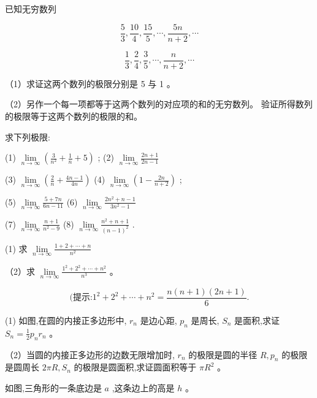 \documentclass[lang=cn,newtx,12pt,scheme=chinese]{elegantbook}
\begin{document}
\begin{problemset}[习题一]
	\item 已知无穷数列
	
	\[
	\frac{5}{3},\frac{10}{4},\frac{15}{5},\cdots ,\frac{5n}{n + 2},\cdots
	\]
	
	\[
	\frac{1}{3},\frac{2}{4},\frac{3}{5},\cdots ,\frac{n}{n + 2},\cdots
	\]
	
	（1）求证这两个数列的极限分别是 5 与 1 。
	
	（2）另作一个每一项都等于这两个数列的对应项的和的无穷数列。 验证所得数列的极限等于这两个数列的极限的和。
	
	\item 求下列极限:
	
	(1) \(\mathop{\lim }\limits_{{n \rightarrow \infty }}\left( {\frac{3}{{n}^{2}} + \frac{1}{n} + 5}\right)\) ; (2) \(\mathop{\lim }\limits_{{n \rightarrow \infty }}\frac{{2n} + 1}{{2n} - 1}\)
	
	(3) \(\mathop{\lim }\limits_{{n \rightarrow \infty }}\left( {\frac{2}{n} + \frac{{4n} - 1}{4n}}\right)\) (4) \(\mathop{\lim }\limits_{{n \rightarrow \infty }}\left( {1 - \frac{2n}{n + 2}}\right)\) ;
	
	(5) \(\mathop{\lim }\limits_{{n \rightarrow \infty }}\frac{5 + {7n}}{{6n} - {11}}\) (6) \(\mathop{\lim }\limits_{{n \rightarrow \infty }}\frac{2{n}^{2} + n - 1}{3{n}^{2} - 1}\)
	
	(7) \(\mathop{\lim }\limits_{{n \rightarrow \infty }}\frac{n + 1}{{n}^{2} - 9}\) (8) \(\mathop{\lim }\limits_{{n \rightarrow \infty }}\frac{{n}^{2} + n + 1}{{\left( n - 1\right) }^{2}}\) .
	
	\item (1) 求 \(\mathop{\lim }\limits_{{n \rightarrow \infty }}\frac{1 + 2 + \cdots + n}{{n}^{2}}\)
	
	（2）求 \(\mathop{\lim }\limits_{{n \rightarrow \infty }}\frac{{1}^{2} + {2}^{2} + \cdots + {n}^{2}}{{n}^{3}}\) 。
	
	\[
	\text{(提示:}{1}^{2} + {2}^{2} + \cdots + {n}^{2} = \frac{n\left( {n + 1}\right) \left( {{2n} + 1}\right) }{6}\text{.}
	\]
	
	\item (1) 如图,在圆的内接正多边形中, \({r}_{n}\) 是边心距, \({p}_{n}\) 是周长, \({S}_{n}\) 是面积,求证 \({S}_{n} = \frac{1}{2}{p}_{n}{r}_{n}\) 。
	
	（2）当圆的内接正多边形的边数无限增加时, \({r}_{n}\) 的极限是圆的半径 \(R,{p}_{n}\) 的极限是圆周长 \({2\pi R},{S}_{n}\) 的极限是圆面积,求证圆面积等于 \(\pi {R}^{2}\) 。
	
	\item 如图,三角形的一条底边是 \(a\) ,这条边上的高是 \(h\) 。
	

\end{problemset}
\end{document}
